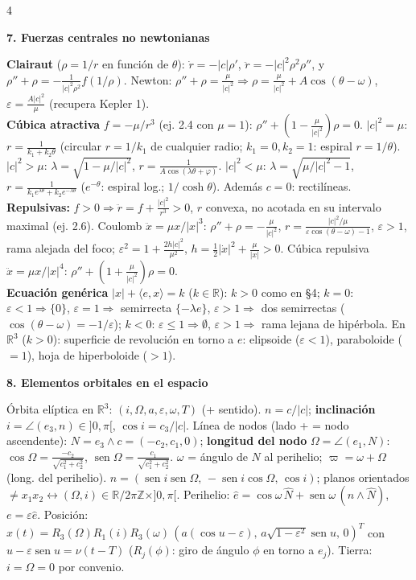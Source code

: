 \documentclass[8pt,a4paper,landscape]{extarticle}
\newcommand{\ip}[2]{\langle #1,#2\rangle}
\newcommand{\ab}[1]{\lvert #1\rvert}
\newcommand{\wg}{\wedge}
\newcommand{\xd}{\dot x}
\newcommand{\xdd}{\ddot x}
\newcommand{\R}{\mathbb{R}}
\DeclareMathOperator{\sen}{sen}
\newcommand{\seccion}[1]{\par\vspace{1.5pt}\noindent\colorbox{blue!12}{\parbox{\dimexpr\linewidth-2\fboxsep\relax}{\textbf{\textcolor{NavyBlue}{#1}}}}\par\vspace{0.5pt}}
\begin{document}
\begin{multicols}{4}
\seccion{7. Fuerzas centrales no newtonianas}
\textbf{Clairaut} ($\rho=1/r$ en función de $\theta$): $\dot r=-\ab c\rho'$, $\ddot r=-\ab c^2\rho^2\rho''$, y
$\boxed{\rho''+\rho=-\frac1{\ab c^2\rho^2}f(1/\rho)}$.
Newton: $\rho''+\rho=\frac\mu{\ab c^2}\Rightarrow\rho=\frac\mu{\ab c^2}+A\cos(\theta-\omega)$, $\varepsilon=\frac{A\ab c^2}\mu$ (recupera Kepler 1).\\
\textbf{Cúbica atractiva} $f=-\mu/r^3$ (ej. 2.4 con $\mu=1$): $\rho''+(1-\frac\mu{\ab c^2})\rho=0$.
$\ab c^2=\mu$: $r=\frac1{k_1+k_2\theta}$ (circular $r=1/k_1$ de cualquier radio; $k_1=0,k_2=1$: espiral $r=1/\theta$).
$\ab c^2>\mu$: $\lambda=\sqrt{1-\mu/\ab c^2}$, $r=\frac1{A\cos(\lambda\theta+\varphi)}$.
$\ab c^2<\mu$: $\lambda=\sqrt{\mu/\ab c^2-1}$, $r=\frac1{k_1e^{\lambda\theta}+k_2e^{-\lambda\theta}}$ ($e^{-\theta}$: espiral log.; $1/\cosh\theta$). Además $c=0$: rectilíneas.\\
\textbf{Repulsivas:} $f>0\Rightarrow\ddot r=f+\frac{\ab c^2}{r^3}>0$, $r$ convexa, no acotada en su intervalo maximal (ej. 2.6). Coulomb $\xdd=\mu x/\ab x^3$: $\rho''+\rho=-\frac\mu{\ab c^2}$, $r=\frac{\ab c^2/\mu}{\varepsilon\cos(\theta-\omega)-1}$, $\varepsilon>1$, rama alejada del foco; $\varepsilon^2=1+\frac{2h\ab c^2}{\mu^2}$, $h=\frac12\ab\xd^2+\frac\mu{\ab x}>0$. Cúbica repulsiva $\xdd=\mu x/\ab x^4$: $\rho''+(1+\frac\mu{\ab c^2})\rho=0$.\\
\textbf{Ecuación genérica} $\ab x+\ip ex=k$ ($k\in\R$): $k>0$ como en §4; $k=0$: $\varepsilon<1\Rightarrow\{0\}$, $\varepsilon=1\Rightarrow$ semirrecta $\{-\lambda e\}$, $\varepsilon>1\Rightarrow$ dos semirrectas ($\cos(\theta-\omega)=-1/\varepsilon$); $k<0$: $\varepsilon\le1\Rightarrow\emptyset$, $\varepsilon>1\Rightarrow$ rama lejana de hipérbola. En $\R^3$ ($k>0$): superficie de revolución en torno a $e$: elipsoide ($\varepsilon<1$), paraboloide ($=1$), hoja de hiperboloide ($>1$).

\seccion{8. Elementos orbitales en el espacio}
Órbita elíptica en $\R^3$: $(i,\Omega,a,\varepsilon,\omega,T)$ (+ sentido). $n=c/\ab c$; \textbf{inclinación} $i=\angle(e_3,n)\in]0,\pi[$, $\cos i=c_3/\ab c$. Línea de nodos (lado + = nodo ascendente): $N=e_3\wg c=(-c_2,c_1,0)$; \textbf{longitud del nodo} $\Omega=\angle(e_1,N)$: $\cos\Omega=\frac{-c_2}{\sqrt{c_1^2+c_2^2}}$, $\sen\Omega=\frac{c_1}{\sqrt{c_1^2+c_2^2}}$. $\omega$ = ángulo de $N$ al perihelio; $\varpi=\omega+\Omega$ (long. del perihelio).
$n=(\sen i\sen\Omega,\,-\sen i\cos\Omega,\,\cos i)$; planos orientados $\neq x_1x_2\leftrightarrow(\Omega,i)\in\R/2\pi\mathbb Z\times]0,\pi[$.
Perihelio: $\hat e=\cos\omega\,\hat N+\sen\omega\,(n\wg\hat N)$, $e=\varepsilon\hat e$.
Posición: $x(t)=R_3(\Omega)R_1(i)R_3(\omega)\,(a(\cos u-\varepsilon),\,a\sqrt{1-\varepsilon^2}\sen u,\,0)^T$ con $u-\varepsilon\sen u=\nu(t-T)$ ($R_j(\phi)$: giro de ángulo $\phi$ en torno a $e_j$).
Tierra: $i=\Omega=0$ por convenio.

\end{multicols}
\end{document}
